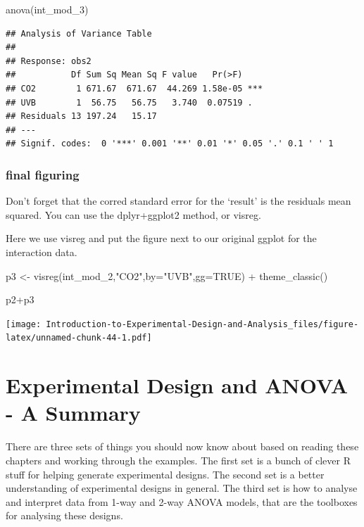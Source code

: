 \documentclass[
]{book}
\newenvironment{Shaded}{\begin{snugshade}}{\end{snugshade}}
\newcommand{\AttributeTok}[1]{\textcolor[rgb]{0.77,0.63,0.00}{#1}}
\newcommand{\ConstantTok}[1]{\textcolor[rgb]{0.00,0.00,0.00}{#1}}
\newcommand{\FunctionTok}[1]{\textcolor[rgb]{0.00,0.00,0.00}{#1}}
\newcommand{\NormalTok}[1]{#1}
\newcommand{\OtherTok}[1]{\textcolor[rgb]{0.56,0.35,0.01}{#1}}
\newcommand{\SpecialCharTok}[1]{\textcolor[rgb]{0.00,0.00,0.00}{#1}}
\newcommand{\StringTok}[1]{\textcolor[rgb]{0.31,0.60,0.02}{#1}}
\begin{document}
\begin{Shaded}
\begin{Highlighting}[]
\FunctionTok{anova}\NormalTok{(int\_mod\_3)}
\end{Highlighting}
\end{Shaded}

\begin{verbatim}
## Analysis of Variance Table
## 
## Response: obs2
##           Df Sum Sq Mean Sq F value   Pr(>F)    
## CO2        1 671.67  671.67  44.269 1.58e-05 ***
## UVB        1  56.75   56.75   3.740  0.07519 .  
## Residuals 13 197.24   15.17                     
## ---
## Signif. codes:  0 '***' 0.001 '**' 0.01 '*' 0.05 '.' 0.1 ' ' 1
\end{verbatim}

\hypertarget{final-figuring}{%
\subsection{final figuring}\label{final-figuring}}

Don't forget that the corred standard error for the `result' is the residuals mean squared. You can use the dplyr+ggplot2 method, or visreg.

Here we use visreg and put the figure next to our original ggplot for the interaction data.

\begin{Shaded}
\begin{Highlighting}[]
\NormalTok{p3 }\OtherTok{\textless{}{-}} \FunctionTok{visreg}\NormalTok{(int\_mod\_2,}\StringTok{"CO2"}\NormalTok{,}\AttributeTok{by=}\StringTok{"UVB"}\NormalTok{,}\AttributeTok{gg=}\ConstantTok{TRUE}\NormalTok{) }\SpecialCharTok{+}
  \FunctionTok{theme\_classic}\NormalTok{()}

\NormalTok{p2}\SpecialCharTok{+}\NormalTok{p3}
\end{Highlighting}
\end{Shaded}

\texttt{[image: Introduction-to-Experimental-Design-and-Analysis\_files/figure-latex/unnamed-chunk-44-1.pdf]}

\hypertarget{experimental-design-and-anova---a-summary}{%
\chapter{Experimental Design and ANOVA - A Summary}\label{experimental-design-and-anova---a-summary}}

There are three sets of things you should now know about based on reading these chapters and working through the examples. The first set is a bunch of clever R stuff for helping generate experimental designs. The second set is a better understanding of experimental designs in general. The third set is how to analyse and interpret data from 1-way and 2-way ANOVA models, that are the toolboxes for analysing these designs.
\end{document}

